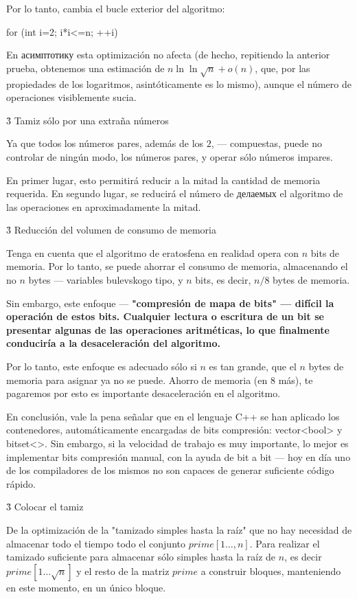 Por lo tanto, cambia el bucle exterior del algoritmo:

\code
for (int i=2; i*i<=n; ++i)
\endcode

En асимптотику esta optimización no afecta (de hecho, repitiendo la anterior prueba, obtenemos una estimación de $n \ln \ln \sqrt{n} + o(n)$, que, por las propiedades de los logaritmos, asintóticamente es lo mismo), aunque el número de operaciones visiblemente sucia.


\h3{ Tamiz sólo por una extraña números }

Ya que todos los números pares, además de los $2$, --- compuestas, puede no controlar de ningún modo, los números pares, y operar sólo números impares.

En primer lugar, esto permitirá reducir a la mitad la cantidad de memoria requerida. En segundo lugar, se reducirá el número de делаемых el algoritmo de las operaciones en aproximadamente la mitad.


\h3{ Reducción del volumen de consumo de memoria }

Tenga en cuenta que el algoritmo de eratosfena en realidad opera con $n$ bits de memoria. Por lo tanto, se puede ahorrar el consumo de memoria, almacenando el no $n$ bytes --- variables bulevskogo tipo, y $n$ bits, es decir, $n/8$ bytes de memoria.

Sin embargo, este enfoque --- \bf{"compresión de mapa de bits"} --- difícil la operación de estos bits. Cualquier lectura o escritura de un bit se presentar algunas de las operaciones aritméticas, lo que finalmente conduciría a la desaceleración del algoritmo.

Por lo tanto, este enfoque es adecuado sólo si $n$ es tan grande, que el $n$ bytes de memoria para asignar ya no se puede. Ahorro de memoria (en $8$ más), te pagaremos por esto es importante desaceleración en el algoritmo.

En conclusión, vale la pena señalar que en el lenguaje C++ se han aplicado los contenedores, automáticamente encargadas de bits compresión: vector<bool> y bitset<>. Sin embargo, si la velocidad de trabajo es muy importante, lo mejor es implementar bits compresión manual, con la ayuda de bit a bit --- hoy en día uno de los compiladores de los mismos no son capaces de generar suficiente código rápido.


\h3{ Colocar el tamiz }

De la optimización de la "tamizado simples hasta la raíz" que no hay necesidad de almacenar todo el tiempo todo el conjunto $prime[1 \ldots, n]$. Para realizar el tamizado suficiente para almacenar sólo simples hasta la raíz de $n$, es decir $prime[1 \ldots \sqrt{n}]$ y el resto de la matriz $prime$ a construir bloques, manteniendo en este momento, en un único bloque.

